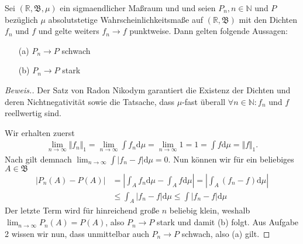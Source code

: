\begin{lemma}
    Sei $(\mathbb{R},\mathfrak{B},\mu)$ ein sigmaendlicher Maßraum und und seien $P_n,n\in\mathbb{N}$ und $P$ bezüglich $\mu$ absolutstetige Wahrscheinlichkeitsmaße auf $(\mathbb{R},\mathfrak{B})$ mit den Dichten $f_n$ und $f$ und gelte weiters $f_n\to f$ punktweise. Dann gelten folgende Aussagen:
    \begin{itemize}
        \item[(a)] $P_n\to P$ schwach
        \item[(b)] $P_n\to P$ stark
    \end{itemize}
\end{lemma}
\begin{proof}[Beweis.]
    Der Satz von Radon Nikodym  garantiert die Existenz der Dichten und deren Nichtnegativität sowie die Tatsache, dass $\mu$-fast überall $\forall n\in\mathbb{N}:f_n$ und $f$ reellwertig sind.

    Wir erhalten zuerst
    \begin{align*}
        \lim_{n\to\infty}\Vert f_n\Vert_1=\lim_{n\to\infty}\int f_n\mathrm{d}\mu=\lim_{n\to\infty}1=1=\int f\mathrm{d}\mu=\Vert f\Vert_1.
    \end{align*}
    Nach gilt demnach $\lim_{n\to\infty}\int \vert f_n-f\vert\mathrm{d}\mu=0$. Nun können wir für ein beliebiges $A\in\mathfrak{B}$
    \begin{align*}
        \left\vert P_n(A)-P(A)\right\vert&=\left\vert \int_Af_n\mathrm{d}\mu-\int_Af\mathrm{d}\mu\right\vert=\left\vert \int_A(f_n-f)\mathrm{d}\mu\right\vert\\
        &\leq\int_A\vert f_n-f\vert\mathrm{d}\mu\leq\int\vert f_n-f\vert\mathrm{d}\mu
    \end{align*}
    Der letzte Term wird für hinreichend große $n$ beliebig klein, weshalb $\lim_{n\to\infty}P_n(A)=P(A)$, also $P_n\to P$ stark und damit (b) folgt. Aus Aufgabe 2 wissen wir nun, dass unmittelbar auch $P_n\to P$ schwach, also (a) gilt.
\end{proof}
